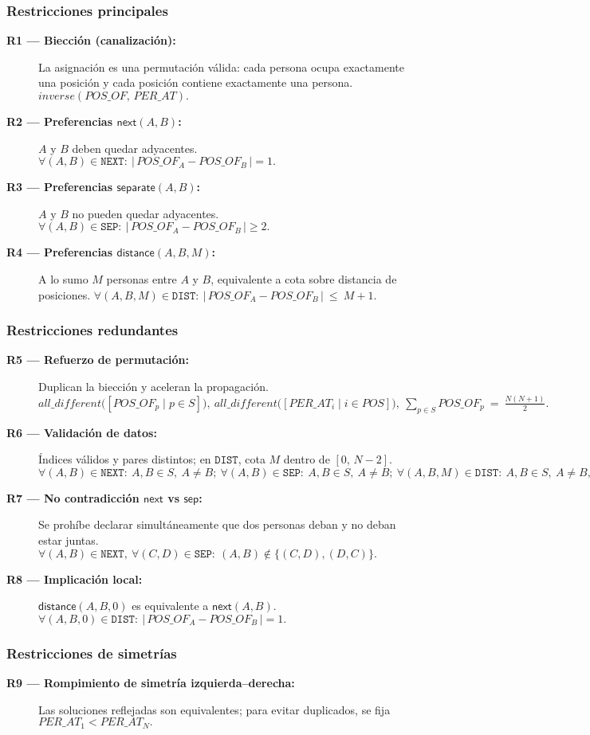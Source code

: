 \subsubsection*{Restricciones principales}
\begin{description}
  \item[\textbf{R1 — Biección (canalización):}] La asignación es una permutación válida: cada persona ocupa exactamente una posición y cada posición contiene exactamente una persona. \(\textit{inverse}(POS\_OF,\,PER\_AT).\)
  \item[\textbf{R2 — Preferencias \(\textsf{next}(A,B)\):}] \(A\) y \(B\) deben quedar adyacentes. \(\forall (A,B)\in \texttt{NEXT}:\ \big|\,POS\_OF_A - POS\_OF_B\,\big| = 1.\)
  \item[\textbf{R3 — Preferencias \(\textsf{separate}(A,B)\):}] \(A\) y \(B\) no pueden quedar adyacentes. \(\forall (A,B)\in \texttt{SEP}:\ \big|\,POS\_OF_A - POS\_OF_B\,\big| \ge 2.\)
  \item[\textbf{R4 — Preferencias \(\textsf{distance}(A,B,M)\):}] A lo sumo \(M\) personas entre \(A\) y \(B\), equivalente a cota sobre distancia de posiciones. \(\forall (A,B,M)\in \texttt{DIST}:\ \big|\,POS\_OF_A - POS\_OF_B\,\big|\ \le\ M+1.\)
\end{description}
\subsubsection*{Restricciones redundantes}
\begin{description}
  \item[\textbf{R5 — Refuerzo de permutación:}] Duplican la biección y aceleran la propagación. \(\textit{all\_different}\big([POS\_OF_p\mid p\in S]\big),\ \textit{all\_different}\big([PER\_AT_i\mid i\in POS]\big),\ \sum_{p\in S} POS\_OF_p\ =\ \frac{N(N+1)}{2}.\)
  \item[\textbf{R6 — Validación de datos:}] Índices válidos y pares distintos; en \(\texttt{DIST}\), cota \(M\) dentro de \([0,\,N\!-\!2]\). \(\forall (A,B)\in \texttt{NEXT}:\ A,B\in S,\ A\ne B;\ \forall (A,B)\in \texttt{SEP}:\ A,B\in S,\ A\ne B;\ \forall (A,B,M)\in \texttt{DIST}:\ A,B\in S,\ A\ne B,\ 0\le M\le N-2.\)
  \item[\textbf{R7 — No contradicción \(\textsf{next}\) vs \(\textsf{sep}\):}] Se prohíbe declarar simultáneamente que dos personas deban y no deban estar juntas. \(\forall (A,B)\in \texttt{NEXT},\ \forall (C,D)\in \texttt{SEP}:\ (A,B)\not\in\{(C,D),(D,C)\}.\)
  \item[\textbf{R8 — Implicación local:}] \(\textsf{distance}(A,B,0)\) es equivalente a \(\textsf{next}(A,B)\). \(\forall (A,B,0)\in \texttt{DIST}:\ \big|\,POS\_OF_A - POS\_OF_B\,\big| = 1.\)
\end{description}
\subsubsection*{Restricciones de simetrías}
\begin{description}
  \item[\textbf{R9 — Rompimiento de simetría izquierda–derecha:}] Las soluciones reflejadas son equivalentes; para evitar duplicados, se fija \(PER\_AT_1<PER\_AT_N.\)
\end{description}



